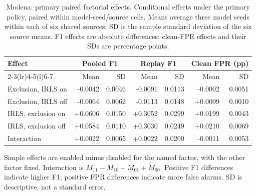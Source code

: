 \begin{table}[tbp]
\centering\small
\setlength{\tabcolsep}{4pt}
\renewcommand{\arraystretch}{1.1}
\caption[Modena: primary paired factorial effects]{Modena: primary paired factorial effects. Conditional effects under the primary policy, paired within model-seed/source cells. Means average three model seeds within each of six shared sources; SD is the sample standard deviation of the six source means. F1 effects are absolute differences; clean-FPR effects and their SDs are percentage points.}
\label{tab:factorial_effects_modena}
\begin{tabular}{@{}lrrrrrr@{}}
\toprule
Effect & \multicolumn{2}{c}{Pooled F1} & \multicolumn{2}{c}{Replay F1} & \multicolumn{2}{c}{Clean FPR (pp)} \\
\cmidrule(lr){2-3}\cmidrule(lr){4-5}\cmidrule(l){6-7}
 & Mean & SD & Mean & SD & Mean & SD \\
\midrule
Exclusion, IRLS on & -0.0042 & 0.0046 & -0.0091 & 0.0113 & -0.0002 & 0.0051 \\
Exclusion, IRLS off & -0.0064 & 0.0062 & -0.0113 & 0.0148 & +0.0009 & 0.0010 \\
IRLS, exclusion on & +0.0606 & 0.0150 & +0.3052 & 0.0299 & +0.0199 & 0.0043 \\
IRLS, exclusion off & +0.0584 & 0.0110 & +0.3030 & 0.0249 & +0.0210 & 0.0069 \\
Interaction & +0.0022 & 0.0065 & +0.0022 & 0.0200 & -0.0011 & 0.0053 \\
\bottomrule
\end{tabular}
\par\smallskip
\begin{minipage}{\linewidth}\footnotesize Simple effects are enabled minus disabled for the named factor, with the other factor fixed. Interaction is $M_{11}-M_{10}-M_{01}+M_{00}$. Positive F1 differences indicate higher F1; positive FPR differences indicate more false alarms. SD is descriptive, not a standard error.\end{minipage}
\end{table}
